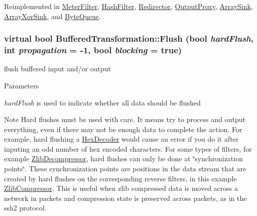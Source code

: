Reimplemented in \hyperlink{class_meter_filter_a49d92192dcbd3366ff0576159ea62e9d}{MeterFilter}, \hyperlink{class_hash_filter_a5c2f3a90ced66c835969ce1aa235b63e}{HashFilter}, \hyperlink{class_redirector_a09afd32c22cc2d4ef9ddc8650b8657f5}{Redirector}, \hyperlink{class_output_proxy_ae0400c5e91f8d8c50e2b4da7d15bf646}{OutputProxy}, \hyperlink{class_array_sink_a10b95ee17a2b7763757b021de0172f5f}{ArraySink}, \hyperlink{class_array_xor_sink_a39567ce27137cc06ed9a2b0a1c834f01}{ArrayXorSink}, and \hyperlink{class_byte_queue_a144c8bb417fc6c9631ae979ce7b7d52a}{ByteQueue}.\hypertarget{class_buffered_transformation_ac6c7f9508d50155d9e75c295b8bc5743}{
\subsubsection[{Flush}]{\setlength{\rightskip}{0pt plus 5cm}virtual bool BufferedTransformation::Flush (bool {\em hardFlush}, \/  int {\em propagation} = {\ttfamily -\/1}, \/  bool {\em blocking} = {\ttfamily true})}}
\label{class_buffered_transformation_ac6c7f9508d50155d9e75c295b8bc5743}


flush buffered input and/or output 
\begin{DoxyParams}{Parameters}
\item[{\em hardFlush}]is used to indicate whether all data should be flushed \end{DoxyParams}
\begin{DoxyNote}{Note}
Hard flushes must be used with care. It means try to process and output everything, even if there may not be enough data to complete the action. For example, hard flushing a \hyperlink{class_hex_decoder}{HexDecoder} would cause an error if you do it after inputing an odd number of hex encoded characters. For some types of filters, for example \hyperlink{class_zlib_decompressor}{ZlibDecompressor}, hard flushes can only be done at \char`\"{}synchronization points\char`\"{}. These synchronization points are positions in the data stream that are created by hard flushes on the corresponding reverse filters, in this example \hyperlink{class_zlib_compressor}{ZlibCompressor}. This is useful when zlib compressed data is moved across a network in packets and compression state is preserved across packets, as in the ssh2 protocol. 
\end{DoxyNote}


